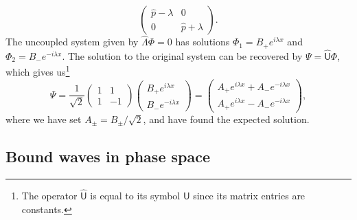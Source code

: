 \begin{example}
\begin{equation}
\begin{pmatrix}
    \hat{p} - \lambda & 0\\
    0 & \hat{p} + \lambda
  \end{pmatrix}.
\end{equation}
%
The uncoupled system given by $\widehat{\Lambda}\Phi = 0 $ has solutions $\Phi_{1} = B_{+}e^{i\lambda x}$ and $\Phi_{2} = B_{-}e^{-i\lambda x}$.
The solution to the original system can be recovered by $\Psi = \widehat{\mathsf{U}}\Phi$, which gives us\footnote{The operator $\widehat{\mathsf{U}}$ is equal to its symbol $\mathsf{U}$ since its matrix entries are constants.}
%
\begin{equation}
  \Psi = \frac{1}{\sqrt{2}}
  \begin{pmatrix}
    1 & 1\\
    1 & -1
  \end{pmatrix}
  \begin{pmatrix}
    B_{+}e^{i\lambda x}\\
    B_{-}e^{-i\lambda x}
  \end{pmatrix}
  =
  \begin{pmatrix}
    A_{+}e^{i\lambda x} + A_{-}e^{-i\lambda x}\\
    A_{+}e^{i\lambda x} - A_{-}e^{-i\lambda x}
  \end{pmatrix},
\end{equation}
%
where we have set $A_{\pm} = B_{\pm}/\sqrt{2}$, and have found the expected solution.
\end{example}

\subsection{Bound waves in phase space}

